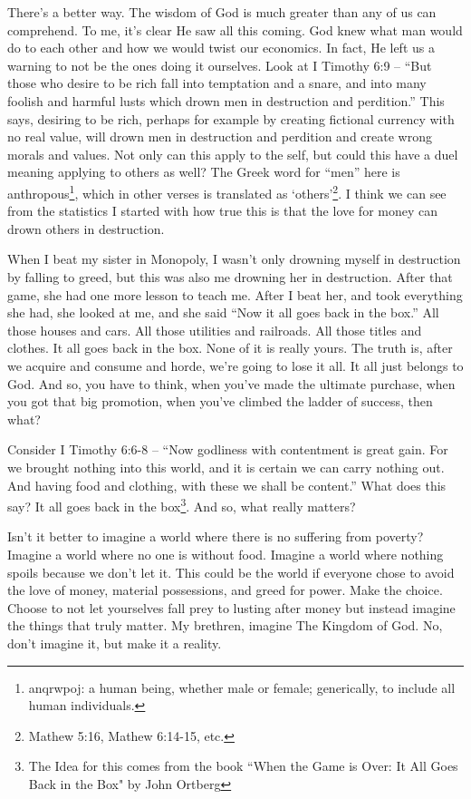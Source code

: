 \documentclass[11pt]{article}
\begin{document}
\begin{multicols}{2}
There’s a better way. The wisdom of God is much greater than any of us can comprehend. To me, it’s clear He saw all this coming. God knew what man would do to each other and how we would twist our economics. In fact, He left us a warning to not be the ones doing it ourselves. Look at I Timothy 6:9 – ``But those who desire to be rich fall into temptation and a snare, and into many foolish and harmful lusts which drown men in destruction and perdition.” This says, desiring to be rich, perhaps for example by creating fictional currency with no real value, will drown men in destruction and perdition and create wrong morals and values. Not only can this apply to the self, but could this have a duel meaning applying to others as well? The Greek word for ``men” here is anthropous\footnote{anqrwpoj: a human being, whether male or female; generically, to include all human individuals.}, which in other verses is translated as `others'\footnote{Mathew 5:16, Mathew 6:14-15, etc.}. I think we can see from the statistics I started with how true this is that the love for money can drown others in destruction.

When I beat my sister in Monopoly, I wasn't only drowning myself in destruction by falling to greed, but this was also me drowning her in destruction. After that game, she had one more lesson to teach me. After I beat her, and took everything she had, she looked at me, and she said ``Now it all goes back in the box.” All those houses and cars. All those utilities and railroads. All those titles and clothes. It all goes back in the box. None of it is really yours. The truth is, after we acquire and consume and horde, we’re going to lose it all. It all just belongs to God. And so, you have to think, when you’ve made the ultimate purchase, when you got that big promotion, when you've climbed the ladder of success, then what?

Consider I Timothy 6:6-8 – ``Now godliness with contentment is great gain. For we brought nothing into this world, and it is certain we can carry nothing out. And having food and clothing, with these we shall be content.” What does this say? It all goes back in the box\footnote{The Idea for this comes from the book ``When the Game is Over: It All Goes Back in the Box" by John Ortberg}. And so, what really matters?

Isn't it better to imagine a world where there is no suffering from poverty? Imagine a world where no one is without food. Imagine a world where nothing spoils because we don’t let it. This could be the world if everyone chose to avoid the love of money, material possessions, and greed for power. Make the choice. Choose to not let yourselves fall prey to lusting after money but instead imagine the things that truly matter. My brethren, imagine The Kingdom of God. No, don’t imagine it, but make it a reality.


\end{multicols}
\end{document}
